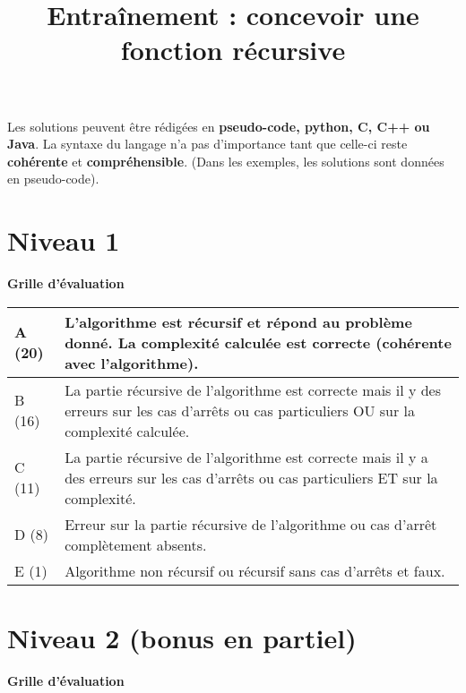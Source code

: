 \documentclass{../cours}
\title{Entraînement : concevoir une fonction récursive}
\begin{document}
\maketitle

Les solutions peuvent être rédigées en \textbf{pseudo-code, python, C, C++ ou Java}. La syntaxe du langage n'a pas d'importance tant que celle-ci reste \textbf{cohérente} et \textbf{compréhensible}. (Dans les exemples, les solutions sont données en pseudo-code).


\section*{Niveau 1}

\textbf{Grille d'évaluation}

\vspace{0.5cm}

\begin{tabular}{|l|p{12cm}|}
\hline
A (20) & \small{L’algorithme est récursif et répond au problème donné. La complexité calculée est correcte (cohérente avec l'algorithme).} \\ \hline
B (16) &\small{La partie récursive de l’algorithme est correcte mais il y des erreurs sur les cas d'arrêts ou cas particuliers OU sur la complexité calculée.} \\ \hline
C (11) & \small{La partie récursive de l’algorithme est correcte mais il y a des erreurs sur les cas d'arrêts ou cas particuliers ET sur la complexité.}\\ \hline
D (8) &\small{Erreur sur la partie récursive de l'algorithme ou cas d'arrêt complètement absents.} \\ \hline
E (1) & \small{Algorithme non récursif ou récursif sans cas d'arrêts et faux.} \\ \hline
\end{tabular}









\section*{Niveau 2 (bonus en partiel)}

\textbf{Grille d'évaluation}

\vspace{0.5cm}
\end{document}

